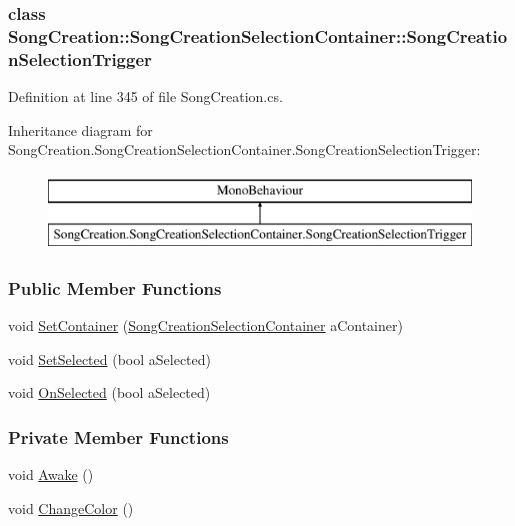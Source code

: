 \subsubsection{class Song\+Creation\+:\+:Song\+Creation\+Selection\+Container\+:\+:Song\+Creation\+Selection\+Trigger}


Definition at line 345 of file Song\+Creation.\+cs.

Inheritance diagram for Song\+Creation.\+Song\+Creation\+Selection\+Container.\+Song\+Creation\+Selection\+Trigger\+:\begin{figure}[H]
\begin{center}
\leavevmode
\includegraphics[height=2.000000cm]{group___s_c_handlers}
\end{center}
\end{figure}
\subsubsection*{Public Member Functions}
\begin{DoxyCompactItemize}
\item 
void \hyperlink{group___s_c_handlers_gaa9ae3234792bb4a0ee0cb16d00563130}{Set\+Container} (\hyperlink{class_song_creation_1_1_song_creation_selection_container}{Song\+Creation\+Selection\+Container} a\+Container)
\item 
void \hyperlink{group___s_c_handlers_ga477673c43fb3b828ed54d06d00e93f08}{Set\+Selected} (bool a\+Selected)
\item 
void \hyperlink{group___s_c_handlers_ga33e6eb8e123cb32f40c2c06149a31087}{On\+Selected} (bool a\+Selected)
\end{DoxyCompactItemize}
\subsubsection*{Private Member Functions}
\begin{DoxyCompactItemize}
\item 
void \hyperlink{group___s_c_handlers_ga1d7d3017d7cc312657926de99f04d73c}{Awake} ()
\item 
void \hyperlink{group___s_c_handlers_ga3e790d06e364f26ed6f8a78cb87bbf6d}{Change\+Color} ()
\end{DoxyCompactItemize}
